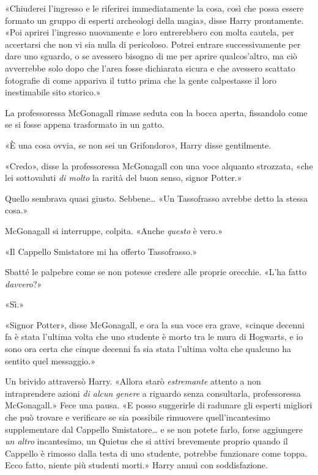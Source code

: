 «Chiuderei l’ingresso e le riferirei immediatamente la cosa, così che possa essere formato un gruppo di esperti archeologi della magia», disse Harry prontamente. «Poi aprirei l’ingresso nuovamente e loro entrerebbero con molta cautela, per accertarsi che non vi sia nulla di pericoloso. Potrei entrare successivamente per dare uno sguardo, o se avessero bisogno di me per aprire qualcos’altro, ma ciò avverrebbe solo dopo che l’area fosse dichiarata sicura e che avessero scattato fotografie di come appariva il tutto prima che la gente calpestasse il loro inestimabile sito storico.»

La professoressa McGonagall rimase seduta con la bocca aperta, fissandolo come se si fosse appena trasformato in un gatto.

«È una cosa ovvia, se non sei un Grifondoro», Harry disse gentilmente.

«Credo», disse la professoressa McGonagall con una voce alquanto strozzata, «che lei sottovaluti \textit{di molto} la rarità del buon senso, signor Potter.»

Quello sembrava quasi giusto. Sebbene… «Un Tassofrasso avrebbe detto la stessa cosa.»

McGonagall si interruppe, colpita. «Anche \textit{questo} è vero.»

«Il Cappello Smistatore mi ha offerto Tassofrasso.»

Sbatté le palpebre come se non potesse credere alle proprie orecchie. «L’ha fatto \textit{davvero}?»

«Sì.»

«Signor Potter», disse McGonagall, e ora la sua voce era grave, «cinque decenni fa è stata l’ultima volta che uno studente è morto tra le mura di Hogwarts, e io sono ora certa che cinque decenni fa sia stata l’ultima volta che qualcuno ha sentito quel messaggio.»

Un brivido attraversò Harry. «Allora starò \textit{estremante} attento a non intraprendere azioni \textit{di alcun genere} a riguardo senza consultarla, professoressa McGonagall.» Fece una pausa. «E posso suggerirle di radunare gli esperti migliori che può trovare e verificare se sia possibile rimuovere quell’incantesimo supplementare dal Cappello Smistatore… e se non potete farlo, forse aggiungere \textit{un altro} incantesimo, un Quietus che si attivi brevemente proprio quando il Cappello è rimosso dalla testa di uno studente, potrebbe funzionare come toppa. Ecco fatto, niente più studenti morti.» Harry annuì con soddisfazione.

